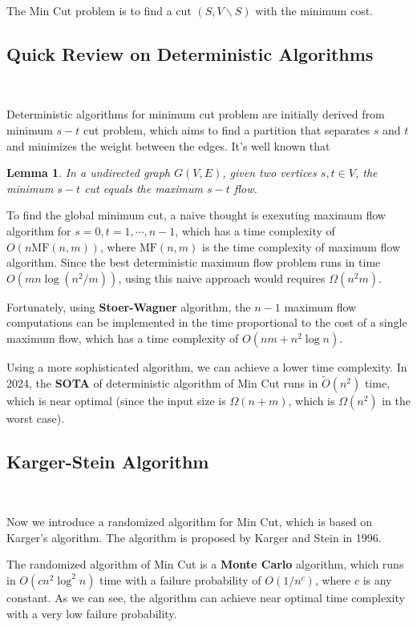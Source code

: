 \documentclass[12pt]{article}
\newtheorem{lemma}{Lemma}
\begin{document}
The Min Cut problem is to find a cut $(S,V\backslash S)$ with the minimum cost.
\subsection{Quick Review on Deterministic Algorithms}\

Deterministic algorithms for minimum cut problem are initially derived from minimum $s-t$ cut problem, which aims to find a partition that separates $s$ and $t$ and minimizes the weight between the edges. It's well known that 
\begin{lemma}
    In a undirected graph $G(V,E)$, given two vertices $s,t\in V$, the minimum $s-t$ cut equals the maximum $s-t$ flow.
\end{lemma}
To find the global minimum cut, a naive thought is exexuting maximum flow algorithm for $s=0,t=1,\cdots,n-1$, which has a time complexity of $O(n\text{MF}(n,m))$, where $\text{MF}(n,m)$ is the time complexity of maximum flow algorithm. Since the best deterministic maximum flow problem runs in time $O(mn\log(n^2/m))$, using this naive approach would requires $\Omega(n^2m)$. 

Fortunately, using \textbf{Stoer-Wagner}\cite{stoer1997simple} algorithm, the $n-1$ maximum flow computations can be implemented in the time proportional to the cost of a single maximum flow, which has a time complexity of $O(nm+n^2\log n)$. 

Using a more sophisticated algorithm, we can achieve a lower time complexity. In 2024, the \textbf{SOTA}\cite{doi:10.1137/1.9781611977912.111} of deterministic algorithm of Min Cut runs in $\tilde{O}(n^2)$ time, which is near optimal (since the input size is $\Omega(n+m)$, which is $\Omega(n^2)$ in the worst case).

\subsection{Karger-Stein Algorithm}\

Now we introduce a randomized algorithm for Min Cut, which is based on Karger's algorithm\cite{karger1996new}. The algorithm is proposed by Karger and Stein in 1996.

The randomized algorithm of Min Cut is a \textbf{Monte Carlo} algorithm, which runs in $O(cn^2\log^2 n)$ time with a failure probability of $O(1/n^c)$, where $c$ is any constant. As we can see, the algorithm can achieve near optimal time complexity with a very low failure probability.
\end{document}
